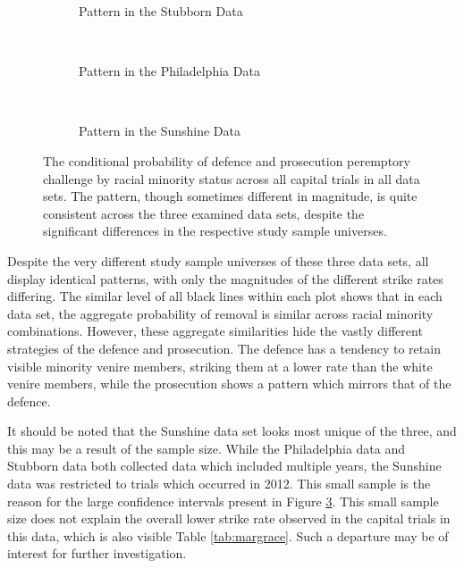 \begin{figure}[h!]
  \centering
  \begin{subfigure}{0.4\textwidth}
    \caption{\footnotesize Pattern in the Stubborn Data}
    \label{fig:stubcomp}
  \end{subfigure}
  ~
  \begin{subfigure}{0.4\textwidth}
    \caption{\footnotesize Pattern in the Philadelphia Data}
    \label{fig:philcomp}
  \end{subfigure}
  ~
  \begin{subfigure}{0.4\textwidth}
    \caption{\footnotesize Pattern in the Sunshine Data}
    \label{fig:suncomp}
  \end{subfigure}
  \caption[Strikes by Race and Defendant Race (All Capital Trial Data)]
  {\footnotesize The conditional probability of defence and prosecution peremptory challenge by racial minority status across all
    capital trials in all data sets. The pattern, though sometimes different in magnitude, is quite consistent across the three
    examined data sets, despite the significant differences in the respective study sample universes.}
  \label{fig:racedefalldata}
\end{figure}

Despite the very different study sample universes of these three data sets, all display identical patterns, with only the
magnitudes of the different strike rates differing. The similar level of all black lines within each plot shows that in each data
set, the aggregate probability of removal is similar across racial minority combinations. However, these aggregate similarities
hide the vastly different strategies of the defence and prosecution. The defence has a tendency to retain visible minority venire
members, striking them at a lower rate than the white venire members, while the prosecution shows a pattern which mirrors that of
the defence.

It should be noted that the Sunshine data set looks most unique of the three, and this may be a result of the sample size. While
the Philadelphia data and Stubborn data both collected data which included multiple years, the Sunshine data was restricted to
trials which occurred in 2012. This small sample is the reason for the large confidence intervals present in Figure
\ref{fig:suncomp}. This small sample size does not explain the overall lower strike rate observed in the capital trials in this
data, which is also visible Table \ref{tab:margrace}. Such a departure may be of interest for further investigation.

